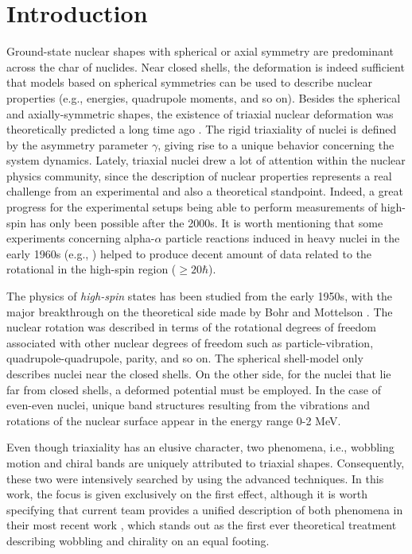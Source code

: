 \chapter{Introduction}

Ground-state nuclear shapes with spherical or axial symmetry are predominant across the char of nuclides. Near closed shells, the deformation is indeed sufficient that models based on spherical symmetries can be used to describe nuclear properties (e.g., energies, quadrupole moments, and so on). Besides the spherical and axially-symmetric shapes, the existence of triaxial nuclear deformation was theoretically predicted a long time ago \cite{bohr1998nuclear}. The rigid triaxiality of nuclei is defined by the asymmetry parameter $\gamma$, giving rise to a unique behavior concerning the system dynamics. Lately, triaxial nuclei drew a lot of attention within the nuclear physics community, since the description of nuclear properties represents a real challenge from an experimental and also a theoretical standpoint. Indeed, a great progress for the experimental setups being able to perform measurements of high-spin has only been possible after the 2000s. It is worth mentioning that some experiments concerning alpha-$\alpha$ particle reactions induced in heavy nuclei in the early 1960s (e.g., \cite{morinaga1963gamma}) helped to produce decent amount of data related to the rotational in the high-spin region ($\geq 20 \hbar$).

The physics of \emph{high-spin} states has been studied from the early 1950s, with the major breakthrough on the theoretical side made by Bohr and Mottelson \cite{bohr1998nuclear}. The nuclear rotation was described in terms of the rotational degrees of freedom associated with other nuclear degrees of freedom such as particle-vibration, quadrupole-quadrupole, parity, and so on. The spherical shell-model only describes nuclei near the closed shells. On the other side, for the nuclei that lie far from closed shells, a deformed potential must be employed. In the case of even-even nuclei, unique band structures resulting from the vibrations and rotations of the nuclear surface appear in the energy range 0-2 MeV. 

Even though triaxiality has an elusive character, two phenomena, i.e., wobbling motion and chiral bands are uniquely attributed to triaxial shapes. Consequently, these two were intensively searched by using the advanced techniques. In this work, the focus is given exclusively on the first effect, although it is worth specifying that current team provides a unified description of both phenomena in their most recent work \cite{raduta2022simultaneous}, which stands out as the first ever theoretical treatment describing wobbling and chirality on an equal footing.

